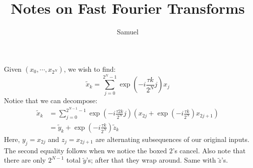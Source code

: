 \documentclass{article}
\title{Notes on Fast Fourier Transforms}
\author{Samuel}
\newcommand{\wrap}[1]{\left( #1 \right)}
\begin{document}
Given $(x_0,\cdots,x_{2^N})$, we wish to find:
$$\tilde{x}_k = \sum_{j=0}^{2^N-1}
                  \exp\wrap{-i \frac{\tau k}{2^N} j} x_j$$
Notice that we can decompose:
\begin{align}
  \tilde{x}_k &= \sum_{j=0}^{2^{N-1}-1}
                   \exp\wrap{-i \frac{\tau \boxed{2}k}{\boxed{2^N}} j}
                   \wrap{x_{2j} + \exp\wrap{-i \frac{\tau k}{2^N}} x_{2j+1}} \\
              &= \tilde{y}_k + \exp\wrap{-i \frac{\tau k}{2^N}} \tilde{z}_k
\end{align}
Here, $y_j=x_{2j}$ and $z_j=x_{2j+1}$ are alternating subsequences of our original inputs.
The second equality follows when we notice the $\boxed{\text{boxed}}$ $2$'s cancel.
Also note that there are only $2^{N-1}$ total $\tilde{y}$'s; after that they wrap around.
Same with $\tilde{z}$'s.
\end{document}
